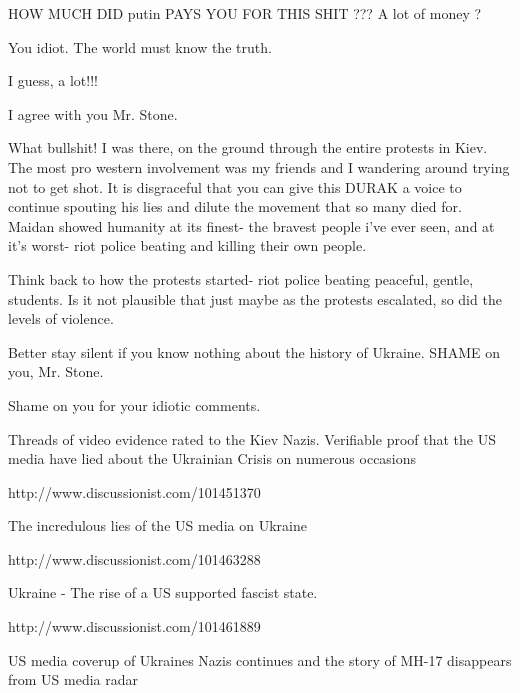 \begin{itemize}

HOW MUCH DID putin PAYS YOU FOR THIS SHIT ??? A lot of money ?

\begin{itemize} %
You idiot. The world must know the truth.

I guess, a lot!!!
\end{itemize} %

I agree with you Mr. Stone.


What bullshit! I was there, on the ground through the entire protests in Kiev.
The most pro western involvement was my friends and I wandering around trying
not to get shot. It is disgraceful that you can give this DURAK a voice to
continue spouting his lies and dilute the movement that so many died for.
Maidan showed humanity at its finest- the bravest people i've ever seen, and at
it's worst- riot police beating and killing their own people.

Think back to how the protests started- riot police beating peaceful, gentle,
students. Is it not plausible that just maybe as the protests escalated, so did
the levels of violence.


Better stay silent if you know nothing about the history of Ukraine. SHAME on you, Mr. Stone.

Shame on you for your idiotic comments.


Threads of video evidence rated to the Kiev Nazis. Verifiable proof that the US
media have lied about the Ukrainian Crisis on numerous occasions

http://www.discussionist.com/101451370

The incredulous lies of the US media on Ukraine

http://www.discussionist.com/101463288

Ukraine - The rise of a US supported fascist state.

http://www.discussionist.com/101461889

US media coverup of Ukraines Nazis continues and the story of MH-17 disappears
from US media radar


\end{itemize} %
